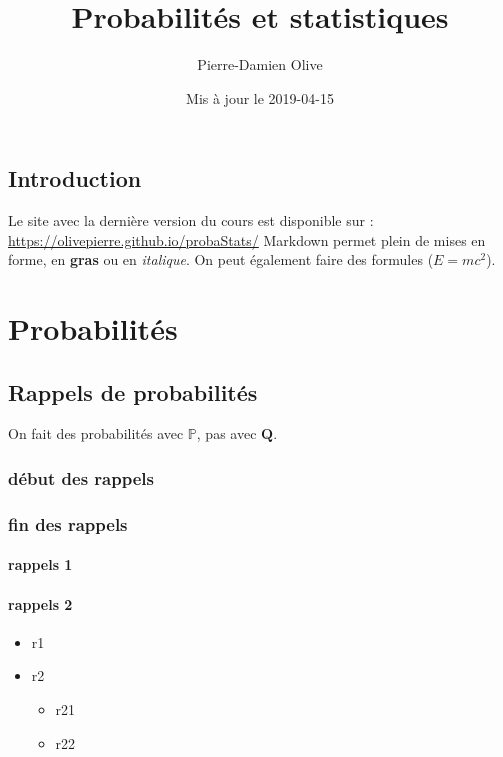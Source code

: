 \documentclass[]{book}
\title{Probabilités et statistiques}
\author{Pierre-Damien Olive}
\date{Mis à jour le 2019-04-15}
\providecommand{\tightlist}{%
  \setlength{\itemsep}{0pt}\setlength{\parskip}{0pt}}
\theoremstyle{definition}
\theoremstyle{definition}
\theoremstyle{definition}
\theoremstyle{remark}
\begin{document}
\maketitle

{
\setcounter{tocdepth}{1}
\tableofcontents
}
\chapter{Introduction}\label{introduction}

Le site avec la dernière version du cours est disponible sur :
\url{https://olivepierre.github.io/probaStats/} Markdown permet plein de
mises en forme, en \textbf{gras} ou en \emph{italique}. On peut
également faire des formules (\(E = mc^2\)).

\part{Probabilités}\label{part-probabilites}

\chapter{Rappels de probabilités}\label{rappels-de-probabilites}

On fait des probabilités avec \(\mathbb{P}\), pas avec \(\mathbf{Q}\).

\section{début des rappels}\label{debut-des-rappels}

\section{fin des rappels}\label{fin-des-rappels}

\subsection{rappels 1}\label{rappels-1}

\subsection{rappels 2}\label{rappels-2}

\begin{itemize}
\tightlist
\item
  r1
\item
  r2

  \begin{itemize}
  \tightlist
  \item
    r21
  \item
    r22
  \end{itemize}
\end{itemize}
\end{document}
